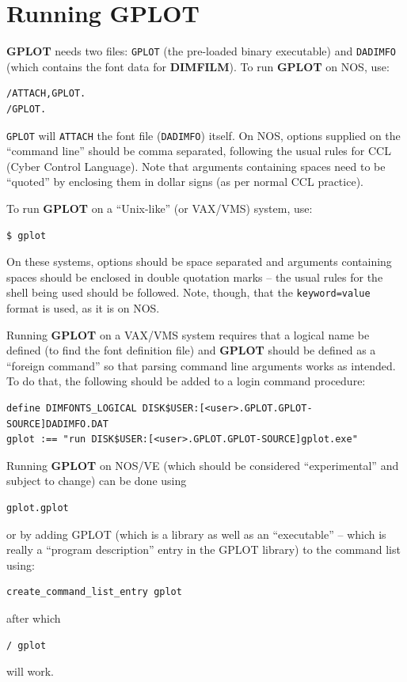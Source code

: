 \documentclass[a4paper,twoside,11pt]{article}
\newcommand{\newpara}{\par\vspace{4mm}\noindent}
\begin{document}
\section{Running \textbf{GPLOT}}
\textbf{GPLOT} needs two files: \texttt{GPLOT} (the pre-loaded binary executable) 
and \texttt{DADIMFO} (which contains
the font data for \textbf{DIMFILM}). To run \textbf{GPLOT} on NOS, use:
\begin{verbatim}
/ATTACH,GPLOT.
/GPLOT.
\end{verbatim}
\texttt{GPLOT} will \texttt{ATTACH} the font file (\texttt{DADIMFO}) itself.
On NOS, options supplied on the ``command line'' should be comma separated, following
the usual rules for CCL (Cyber Control Language). Note that arguments containing spaces
need to be ``quoted'' by enclosing them in dollar signs (as per normal CCL practice).

\newpara
To run \textbf{GPLOT} on a ``Unix-like'' (or VAX/VMS) system, use:
\begin{verbatim}
$ gplot
\end{verbatim}
On these systems, options should be space separated and arguments containing spaces
should be enclosed in double quotation marks -- the usual rules for the shell being
used should be followed. Note, though, that the \texttt{keyword=value} format is used, as
it is on NOS.

\newpara
Running \textbf{GPLOT} on a VAX/VMS system requires that a logical name be defined (to find
the font definition file) and \textbf{GPLOT} should be defined as a ``foreign command'' so that
parsing command line arguments works as intended. To do that, the following should be added
to a login command procedure:
\begin{verbatim}
define DIMFONTS_LOGICAL DISK$USER:[<user>.GPLOT.GPLOT-SOURCE]DADIMFO.DAT
gplot :== "run DISK$USER:[<user>.GPLOT.GPLOT-SOURCE]gplot.exe"
\end{verbatim}

\newpara
Running \textbf{GPLOT} on NOS/VE (which should be considered ``experimental'' and subject
to change) can be done using
\begin{verbatim}
gplot.gplot
\end{verbatim}
or by adding GPLOT (which is a library as well as an ``executable'' -- which is really a ``program description''
entry in the GPLOT library) to the command list using:
\begin{verbatim}
create_command_list_entry gplot
\end{verbatim}
after which
\begin{verbatim}
/ gplot
\end{verbatim}
will work.
\end{document}
